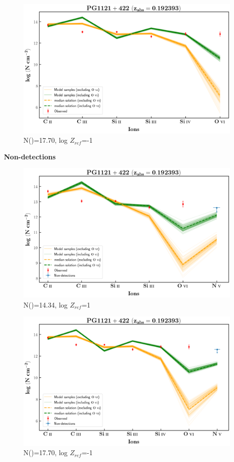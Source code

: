 \documentclass[12pt]{report}
\newcommand\ion[2]{\text{#1\,\textsc{\lowercase{#2}}}}
\begin{document}
\newpage

\begin{figure}[!h]
    \centering
    \includegraphics[width=0.85\linewidth]{Ionisation-Modelling-Plots/pg1121-z=0.192393-compII.png}
    \caption{N(\ion{H}{i})=17.70, log $Z_{ref}$=-1}
\end{figure}


\newpage

\textbf{Non-detections}

\begin{figure}[!h]
    \centering
    \includegraphics[width=0.8\linewidth]{Ionisation-Modelling-Plots/pg1121-z=0.192393-compI_logZ=1_non_detection.png}
    \caption{N(\ion{H}{i})=14.34, log $Z_{ref}$=1}
\end{figure}

\begin{figure}[!h]
    \centering
    \includegraphics[width=0.8\linewidth]{Ionisation-Modelling-Plots/pg1121-z=0.192393-compII_logZ=-1_non_detection.png}
    \caption{N(\ion{H}{i})=17.70, log $Z_{ref}$=-1}
\end{figure}
\end{document}
